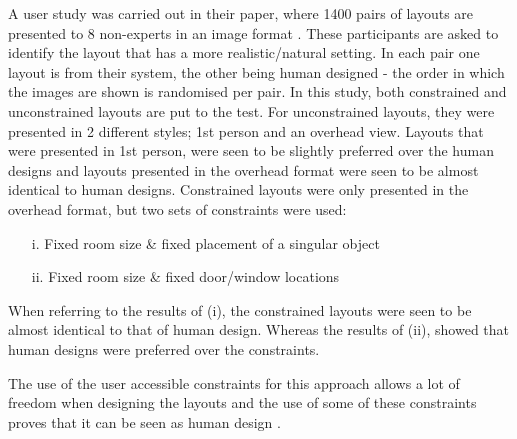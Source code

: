 
A user study was carried out in their paper, where 1400 pairs of layouts are presented to 8 non-experts in an image format \cite{constrained-layouts}. These participants are asked to identify the layout that has a more realistic/natural setting. In each pair one layout is from their system, the other being human designed - the order in which the images are shown is randomised per pair.
In this study, both constrained and unconstrained layouts are put to the test. For unconstrained layouts, they were presented in 2 different styles; 1st person and an overhead view. Layouts that were presented in 1st person, were seen to be slightly preferred over the human designs and layouts presented in the overhead format were seen to be almost identical to human designs.
Constrained layouts were only presented in the overhead format, but two sets of constraints were used:
\begin{enumerate}
    \item[i.] Fixed room size \& fixed placement of a singular object
    \item[ii.] Fixed room size \& fixed door/window locations
\end{enumerate}
When referring to the results of (i), the constrained layouts were seen to be almost identical to that of human design. Whereas the results of (ii), showed that human designs were preferred over the constraints.

The use of the user accessible constraints for this approach allows a lot of freedom when designing the layouts and the use of some of these constraints proves that it can be seen as human design \cite{constrained-layouts}.

\bigskip
